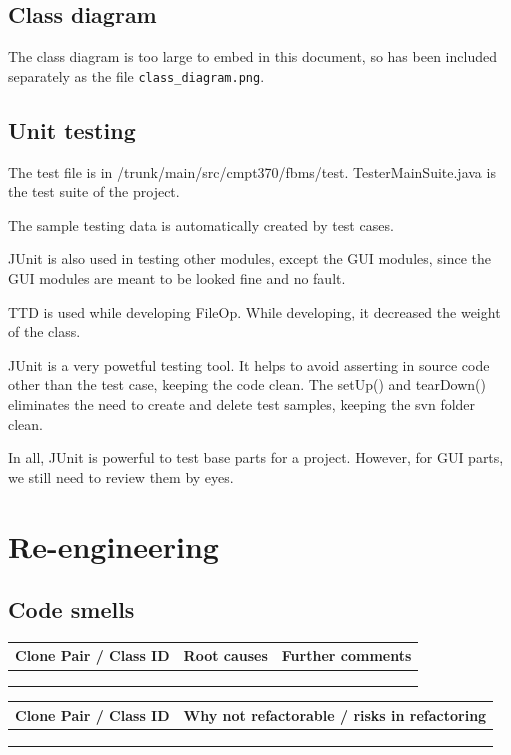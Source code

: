 \documentclass[12pt,a4paper]{article}
\newcommand\todonote[1]{{\color{red}\fbox{\parbox{\dimexpr\linewidth-2\fboxsep-2\fboxrule}{\textit\large{\textbf{TODO: #1}}}}}}
\begin{document}
\subsection{Class diagram}
The class diagram is too large to embed in this document, so has been included separately as the file \texttt{class\_{}diagram.png}.

\subsection{Unit testing}

The test file is in /trunk/main/src/cmpt370/fbms/test. TesterMainSuite.java is the test suite of the project.

The sample testing data is automatically created by test cases.\par
JUnit is also used in testing other modules, except the GUI modules, since the GUI modules are meant to be looked fine and no fault.

TTD is used while developing FileOp.  While developing, it decreased the weight of the class.

JUnit is a very powetful testing tool. It helps to avoid asserting in source code other than the test case, keeping the code clean. The setUp() and tearDown() eliminates the need to create and delete test samples, keeping the svn folder clean.

In all, JUnit is powerful to test base parts for a project. However, for GUI parts, we still need to review them by eyes.


\section{Re-engineering}

\subsection{Code smells}
\todonote{Done by Mike}

\begin{longtable}{| p{2.75cm} | p{4cm} | p{8cm} |}
  \hline
  \textbf{Clone Pair / Class ID} & \textbf{Root causes} & \textbf{Further comments} \\ \hline
    &  &   \\ \hline
    &  &   \\ \hline
    &  &   \\ \hline
\end{longtable}

\begin{longtable}{| p{2.75cm} | p{12.5cm} |}
  \hline
  \textbf{Clone Pair / Class ID} & \textbf{Why not refactorable / risks in refactoring} \\ \hline
    &   \\ \hline
    &   \\ \hline
    &   \\ \hline
\end{longtable}
\end{document}
